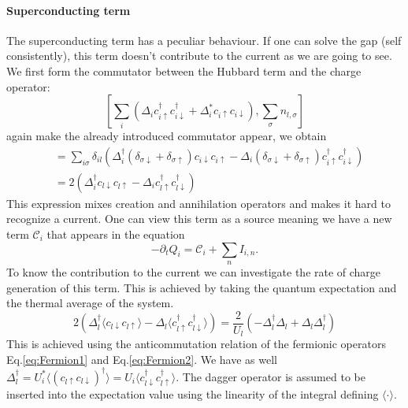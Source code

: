 \documentclass[../main.tex]{subfile}
\begin{document}
\paragraph{Superconducting term} The superconducting term has a peculiar behaviour. If one can solve the gap (self consistently), this term 
doesn't contribute to the current as we are going to see. We first form the commutator between the Hubbard term and the charge operator:
\begin{equation*}
        \left[\sum_i\left(\Delta_i c_{i\uparrow}^{\dagger}c_{i\downarrow}^{\dagger} + 
        \Delta_i^{\ast} c_{i\uparrow}c_{i\downarrow}\right) , \sum_{\sigma} n_{l,\sigma}\right]
\end{equation*}
again make the already introduced commutator appear, we obtain
\begin{equation*}
    \begin{aligned}
    &= \sum_{i\sigma} \delta_{il}\left(\Delta_i^{\dagger} (\delta_{\sigma\downarrow} + \delta_{\sigma\uparrow})c_{i\downarrow}c_{i\uparrow} 
    -\Delta_i(\delta_{\sigma\downarrow} + \delta_{\sigma\uparrow})c_{i\uparrow}^{\dagger} c_{i\downarrow}^{\dagger}\right)\\
    &= 2 \left( \Delta_i^{\dagger} c_{l\downarrow}c_{l\uparrow} - \Delta_i c_{l\uparrow}^{\dagger}c_{l\downarrow}^{\dagger}\right)
    \end{aligned}
\end{equation*}
This expression mixes creation and annihilation operators and makes it hard to recognize a current. One can view this term as a 
source meaning we have a new term $\mathcal{C}_i$ that appears in the equation  
\[
    -\partial_t Q_i = \mathcal{C}_i +  \sum_n I_{i,n}  .
\]
To know the contribution to the current we can investigate the rate of charge generation of this term. This is achieved by taking the quantum
expectation and the thermal average of the system.
\[
    2 \left( \Delta_l^{\dagger}\langle c_{l\downarrow}c_{l\uparrow}\rangle - \Delta_l \langle c_{l\uparrow}^{\dagger}c_{l\downarrow}^{\dagger}\rangle\right)
    = \frac{2}{U_l}\left(-\Delta_l^{\dagger}\Delta_l + \Delta_l \Delta_l^{\dagger}\right)
\]
This is achieved using the anticommutation relation of the fermionic operators Eq.\ref{eq:Fermion1} and Eq.\ref{eq:Fermion2}. 
We have as well $\Delta_l^{\dagger} = U_i^{\ast} \langle(c_{l\uparrow}c_{l\downarrow})^{\dagger}\rangle = U_i \langle c_{l\downarrow}^{\dagger} c_{l\uparrow}^{\dagger}\rangle$.
The dagger operator is assumed to be inserted into the expectation value using the linearity of the integral defining $\langle \cdot\rangle$.
\end{document}
